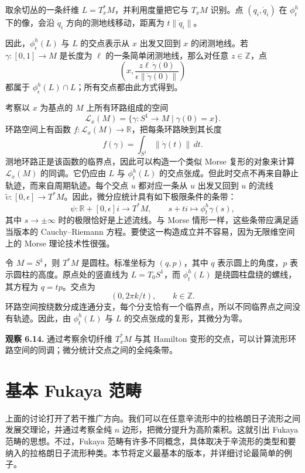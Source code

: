 取余切丛的一条纤维 $L=T_x^*M$，并利用度量把它与 $T_xM$ 识别。点 $(q_i,\dot q_i)$ 在 $\phi_t^h$ 下的像，会沿 $\dot q_i$ 方向的测地线移动，距离为 $t\|\dot q_i\|$。

因此，$\phi_\epsilon^h(L)$ 与 $L$ 的交点表示从 $x$ 出发又回到 $x$ 的闭测地线。若 $\gamma\colon[0,1]\to M$ 是长度为 $\ell$ 的一条简单闭测地线，那么对任意 $z\in\mathbb Z$，点
\[
  \left(x,\frac{z\ell\,\dot\gamma(0)}{\epsilon\|\dot\gamma(0)\|}\right)
\]
都属于 $\phi_\epsilon^h(L)\cap L$；所有交点都由此方式得到。

考察以 $x$ 为基点的 $M$ 上所有环路组成的空间
\[
  \mathcal L_x(M)=\{\gamma\colon S^1\to M\mid\gamma(0)=x\}.
\]
环路空间上有函数 $f\colon\mathcal L_x(M)\to\mathbb R$，把每条环路映到其长度
\[
  f(\gamma)=\int_{S^1}\|\dot\gamma(t)\|\,dt.
\]
测地环路正是该函数的临界点，因此可以构造一个类似 Morse 复形的对象来计算 $\mathcal L_x(M)$ 的同调。它仍应由 $L$ 与 $\phi_t^h(L)$ 的交点张成。但此时交点不再来自静止轨迹，而来自周期轨迹。每个交点 $u$ 都对应一条从 $u$ 出发又回到 $u$ 的流线 $\widetilde\upsilon\colon[0,\epsilon]\to T^*M$。因此，微分应统计具有如下极限条件的条带：
\[
  \psi\colon\mathbb R+[0,\epsilon]i\to T^*M,
  \qquad s+ti\longmapsto\phi_t^h\gamma(s),
\]
其中 $s\to\pm\infty$ 时的极限恰好是上述流线。与 Morse 情形一样，这些条带应满足适当版本的 Cauchy--Riemann 方程。要使这一构造成立并不容易，因为无限维空间上的 Morse 理论技术性很强。

\begin{example}[圆周的环路空间]
令 $M=S^1$，则 $T^*M$ 是圆柱。标准坐标为 $(q,p)$，其中 $q$ 表示圆上的角度，$p$ 表示圆柱的高度。原点处的竖直线为 $L=T_0S^1$，而 $\phi_t^h(L)$ 是绕圆柱盘绕的螺线，其方程为 $q=tp$。交点为
\[
  (0,2\pi k/t),\qquad k\in\mathbb Z.
\]
环路空间按绕数分成连通分支，每个分支恰有一个临界点，所以不同临界点之间没有轨迹。因此，由 $\phi_t^h(L)$ 与 $L$ 的交点张成的复形，其微分为零。
\end{example}

\begin{note}\label{note:loop-space-intersections}
\textbf{观察 6.14.} 通过考察余切纤维 $T_x^*M$ 与其 Hamilton 变形的交点，可以计算流形环路空间的同调；微分统计交点之间的全纯条带。
\end{note}

\section{基本 Fukaya 范畴}\label{sec:basic-fukaya}
上面的讨论打开了若干推广方向。我们可以在任意辛流形中的拉格朗日子流形之间发展交理论，并通过考察全纯 $n$ 边形，把微分提升为高阶乘积。这就引出 Fukaya 范畴的思想。不过，Fukaya 范畴有许多不同概念，具体取决于辛流形的类型和要纳入的拉格朗日子流形种类。本节将定义最基本的版本，并详细讨论最简单的例子。

